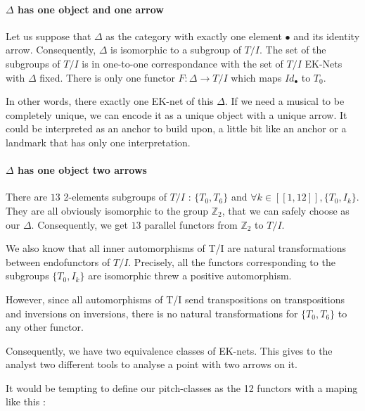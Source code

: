 \paragraph{$\Delta$ has one object and one arrow}
Let us suppose that $\Delta$ as the category with exactly one element $\bullet$ and its identity arrow. Consequently, $\Delta$ is isomorphic to a subgroup of $T/I$. The set of the subgroups of $T/I$ is in one-to-one correspondance with the set of $T/I$ EK-Nets with $\Delta$ fixed.
There is only one functor $F:\Delta \rightarrow T/I$ which maps $Id_\bullet$ to $T_0$.

In other words, there exactly one EK-net of this $\Delta$. If we need a musical to be completely unique, we can encode it as a unique object with a unique arrow. It could be interpreted as an anchor to build upon, a little bit like an anchor or a landmark that has only one interpretation.



\paragraph{$\Delta$ has one object two arrows}
There are $13$ 2-elements subgroups of $T/I$ : $\{T_0,T_6\}$ and $\forall k\in[\![1,12]\!], \{T_0,I_k\}$. They are all obviously isomorphic to the group $\mathbb{Z}_2$, that we can safely choose as our $\Delta$. Consequently, we get $13$ parallel functors from $\mathbb{Z}_2$ to $T/I$.

We also know that all inner automorphisms of T/I are natural transformations between endofunctors of $T/I$\cite{roberts2007inner}. Precisely, all the functors corresponding to the subgroups $\{T_0,I_k\}$ are isomorphic threw a positive automorphism.

However, since all automorphisms of T/I send transpositions on transpositions and inversions on inversions, there is no natural transformations for $\{T_0,T_6\}$ to any other functor.

Consequently, we have two equivalence classes of EK-nets. This gives to the analyst two different tools to analyse a point with two arrows on it.

It would be tempting to define our pitch-classes as the 12 functors with a maping like this :


